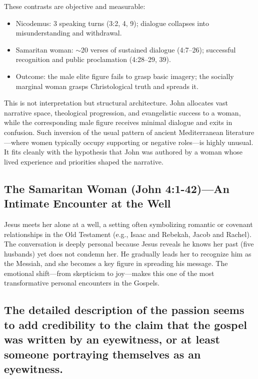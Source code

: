 These contrasts are objective and measurable:

\begin{itemize}
\item Nicodemus: 3 speaking turns (3:2, 4, 9); dialogue collapses into misunderstanding and withdrawal.
\item Samaritan woman: $\sim$20 verses of sustained dialogue (4:7--26); successful recognition and public proclamation (4:28--29, 39).
\item Outcome: the male elite figure fails to grasp basic imagery; the socially marginal woman grasps Christological truth and spreads it.
\end{itemize}

This is not interpretation but structural architecture.
John allocates vast narrative space, theological progression, and evangelistic success to a woman, while the corresponding male figure receives minimal dialogue and exits in confusion.
Such inversion of the usual pattern of ancient Mediterranean literature---where women typically occupy supporting or negative roles---is highly unusual.
It fits cleanly with the hypothesis that John was authored by a woman whose lived experience and priorities shaped the narrative.

\subsection{The Samaritan Woman (John 4:1-42)---An Intimate Encounter at the Well}\label{subsec:the-samaritan-woman-john-41-42-an-intimate-encounter-at-the-well}

Jesus meets her alone at a well, a setting often symbolizing romantic or covenant relationships in the Old Testament (e.g., Isaac and Rebekah, Jacob and Rachel).
The conversation is deeply personal because Jesus reveals he knows her past (five husbands) yet does not condemn her.
He gradually leads her to recognize him as the Messiah, and she becomes a key figure in spreading his message.
The emotional shift---from skepticism to joy---makes this one of the most transformative personal encounters in the Gospels.

\subsection{The detailed description of the passion seems to add credibility to the claim that the gospel was written by an eyewitness, or at least someone portraying themselves as an eyewitness.}\label{subsec:the-detailed-description-of-the-passion-seems-to-add-credibility-to-the-claim-that-the-gospel-was-written-by-an-eyewitness-or-at-least-someone-portraying-themselves-as-an-eyewitness.}

